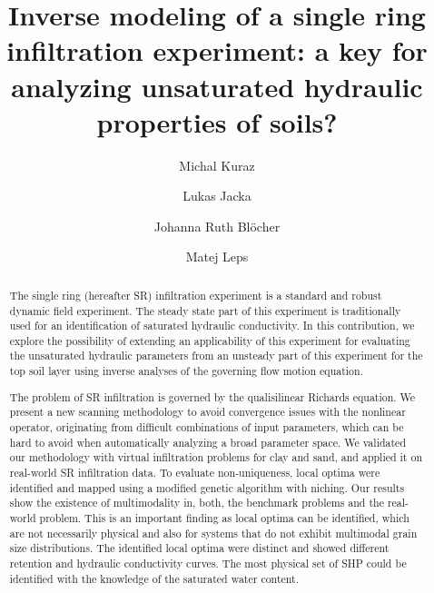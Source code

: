 \documentclass[review,times,3p,10pt]{elsarticle}
\begin{document}
\begin{frontmatter}

\title{Inverse modeling of a single ring infiltration experiment: a key for analyzing unsaturated hydraulic properties of soils?}

\author[autor1]{Michal Kuraz}

\author[autor1]{Lukas Jacka}

\author[autor1]{Johanna Ruth Bl\"ocher}

\author[autor2]{Matej Leps}



\address[autor1]{Czech University of Life Sciences Prague, Faculty of Environmental Sciences, Department of Water Resources and Environmental Modeling}

\address[autor2]{Czech Technical University in Prague, Faculty of Civil Engineering, Department of Mechanics}

\begin{abstract}
The single ring (hereafter SR) infiltration experiment is a standard and robust dynamic field experiment. The steady state part of this experiment is traditionally used for an identification of saturated hydraulic conductivity. In this contribution, we explore the possibility of extending an applicability of this experiment for evaluating the unsaturated hydraulic parameters from an unsteady part of this experiment for the top soil layer using inverse analyses of the governing flow motion equation.

The problem of SR infiltration is governed by the qualisilinear Richards equation. We present a new scanning methodology to avoid convergence issues with the nonlinear operator, originating from difficult combinations of input parameters, which can be hard to avoid when automatically analyzing a broad parameter space. We validated our methodology with virtual infiltration problems for clay and sand, and applied it on real-world SR infiltration data. To evaluate non-uniqueness, local optima were identified and mapped using a modified genetic algorithm with niching.
Our results show the existence of multimodality in, both, the benchmark problems and the real-world problem. This is an important finding as local optima can be identified, which are not necessarily physical and also for systems that do not exhibit multimodal grain size distributions. The identified local optima were distinct and showed different retention and hydraulic conductivity curves. The most physical set of SHP could be identified with the knowledge of the saturated water content. 





\end{abstract}
\end{frontmatter}
\end{document}
